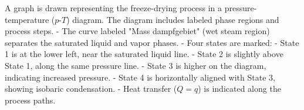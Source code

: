 A graph is drawn representing the freeze-drying process in a pressure-temperature (\(p\)-\(T\)) diagram. The diagram includes labeled phase regions and process steps.  
- The curve labeled "Mass dampfgebiet" (wet steam region) separates the saturated liquid and vapor phases.  
- Four states are marked:  
  - State 1 is at the lower left, near the saturated liquid line.  
  - State 2 is slightly above State 1, along the same pressure line.  
  - State 3 is higher on the diagram, indicating increased pressure.  
  - State 4 is horizontally aligned with State 3, showing isobaric condensation.  
- Heat transfer (\(Q = q\)) is indicated along the process paths.